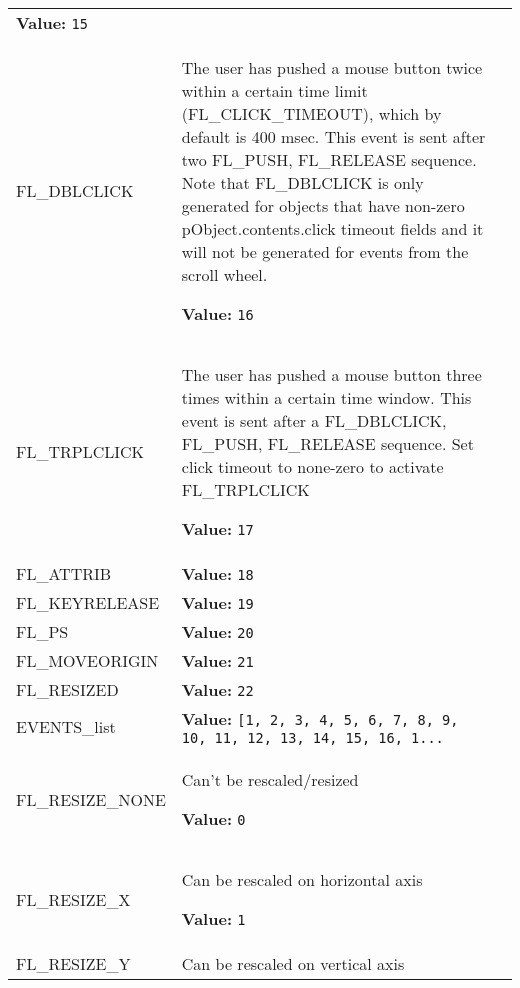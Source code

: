 \begin{longtable}{|p{\varnamewidth}|p{\vardescrwidth}|l}
\textbf{Value:} 
{\tt 15}&\\
\cline{1-2}
\raggedright F\-L\-\_\-D\-B\-L\-C\-L\-I\-C\-K\- & \raggedright The user has pushed a mouse button twice within a certain time limit
(FL\_CLICK\_TIMEOUT), which by default is 400 msec. This event is sent
after two FL\_PUSH, FL\_RELEASE sequence. Note that FL\_DBLCLICK is only
generated for objects that have non-zero pObject.contents.click timeout
fields and it will not be generated for events from the scroll wheel.

\textbf{Value:} 
{\tt 16}&\\
\cline{1-2}
\raggedright F\-L\-\_\-T\-R\-P\-L\-C\-L\-I\-C\-K\- & \raggedright The user has pushed a mouse button three times within a certain time
window. This event is sent after a FL\_DBLCLICK, FL\_PUSH, FL\_RELEASE
sequence. Set click timeout to none-zero to activate FL\_TRPLCLICK

\textbf{Value:} 
{\tt 17}&\\
\cline{1-2}
\raggedright F\-L\-\_\-A\-T\-T\-R\-I\-B\- & \raggedright \textbf{Value:} 
{\tt 18}&\\
\cline{1-2}
\raggedright F\-L\-\_\-K\-E\-Y\-R\-E\-L\-E\-A\-S\-E\- & \raggedright \textbf{Value:} 
{\tt 19}&\\
\cline{1-2}
\raggedright F\-L\-\_\-P\-S\- & \raggedright \textbf{Value:} 
{\tt 20}&\\
\cline{1-2}
\raggedright F\-L\-\_\-M\-O\-V\-E\-O\-R\-I\-G\-I\-N\- & \raggedright \textbf{Value:} 
{\tt 21}&\\
\cline{1-2}
\raggedright F\-L\-\_\-R\-E\-S\-I\-Z\-E\-D\- & \raggedright \textbf{Value:} 
{\tt 22}&\\
\cline{1-2}
\raggedright E\-V\-E\-N\-T\-S\-\_\-l\-i\-s\-t\- & \raggedright \textbf{Value:} 
{\tt \texttt{[}1\texttt{, }2\texttt{, }3\texttt{, }4\texttt{, }5\texttt{, }6\texttt{, }7\texttt{, }8\texttt{, }9\texttt{, }10\texttt{, }11\texttt{, }12\texttt{, }13\texttt{, }14\texttt{, }15\texttt{, }16\texttt{, }1\texttt{...}}&\\
\cline{1-2}
\raggedright F\-L\-\_\-R\-E\-S\-I\-Z\-E\-\_\-N\-O\-N\-E\- & \raggedright Can't be rescaled/resized

\textbf{Value:} 
{\tt 0}&\\
\cline{1-2}
\raggedright F\-L\-\_\-R\-E\-S\-I\-Z\-E\-\_\-X\- & \raggedright Can be rescaled on horizontal axis

\textbf{Value:} 
{\tt 1}&\\
\cline{1-2}
\raggedright F\-L\-\_\-R\-E\-S\-I\-Z\-E\-\_\-Y\- & \raggedright Can be rescaled on vertical axis


\end{longtable}
